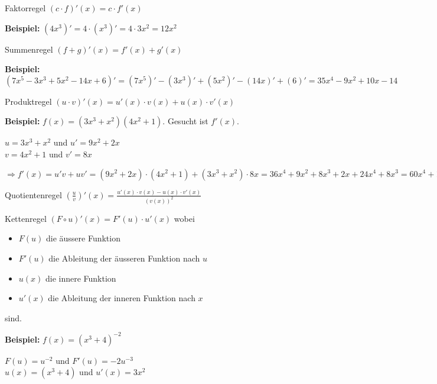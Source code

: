 \begin{definition}{Faktorregel}
    $(c \cdot f)'(x) = c \cdot f'(x)$
\end{definition}

\textbf{Beispiel:} $(4x^3)' = 4 \cdot (x^3)' = 4 \cdot 3x^2 = 12x^2$

\begin{definition}{Summenregel}
    $(f + g)'(x) = f'(x) + g'(x)$
\end{definition}

\textbf{Beispiel:} $(7x^5 - 3x^3 + 5x^2 - 14x + 6)' = (7x^5)' - (3x^3)' + (5x^2)' - (14x)' + (6)' = 35x^4 - 9x^2 + 10x - 14$

\begin{definition}{Produktregel}
    $(u \cdot v)'(x) = u'(x) \cdot v(x) + u(x) \cdot v'(x)$
\end{definition}

\textbf{Beispiel:} $f(x) = (3x^3 + x^2)(4x^2 + 1)$.
Gesucht ist $f'(x)$.

$u = 3x^3 + x^2$ und $u' = 9x^2 + 2x$\\
$v = 4x^2 + 1$ und $v' = 8x$

$\Rightarrow f'(x) = u'v + uv' = (9x^2 + 2x) \cdot (4x^2 + 1) + (3x^3 + x^2) \cdot 8x = 36x^4 + 9x^2 + 8x^3 + 2x + 24x^4 + 8x^3 = 60x^4 + 16x^3 + 9x^2 + 2x$

\begin{definition}{Quotientenregel}
    $\left( \frac{u}{v} \right)'(x) = \frac{u'(x) \cdot v(x) - u(x) \cdot v'(x)}{(v(x))^2}$
\end{definition}

\begin{definition}{Kettenregel}
    $(F \circ u)'(x) = F'(u) \cdot u'(x)$ wobei
    \begin{itemize}
        \item $F(u)$ die äussere Funktion
        \item $F'(u)$ die Ableitung der äusseren Funktion nach $u$
        \item $u(x)$ die innere Funktion
        \item $u'(x)$ die Ableitung der inneren Funktion nach $x$
    \end{itemize}
    sind.
\end{definition}

\textbf{Beispiel:} $f(x) = (x^3 + 4)^{-2}$

$F(u) = u^{-2}$ und $F'(u) = -2u^{-3}$\\
$u(x) = (x^3 + 4)$ und $u'(x) = 3x^2$

